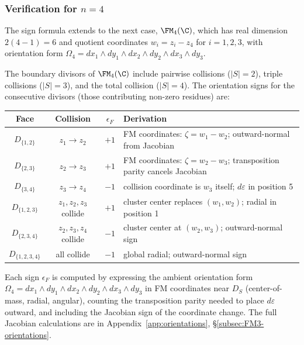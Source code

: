 \subsubsection{\texorpdfstring{Verification for $n=4$}{Verification for n=4}}

The sign formula extends to the next case, $\FM_4(\C)$, which has real dimension $2(4-1) = 6$ and quotient coordinates $w_i = z_i - z_4$ for $i = 1,2,3$, with orientation form $\Omega_4 = dx_1 \wedge dy_1 \wedge dx_2 \wedge dy_2 \wedge dx_3 \wedge dy_3$.

The boundary divisors of $\FM_4(\C)$ include pairwise collisions ($|S| = 2$), triple collisions ($|S| = 3$), and the total collision ($|S| = 4$). The orientation signs for the consecutive divisors (those contributing non-zero residues) are:

\medskip
\begin{center}
\renewcommand{\arraystretch}{1.3}
\begin{tabular}{c|c|c|l}
\textbf{Face} & \textbf{Collision} & $\epsilon_F$ & \textbf{Derivation} \\
\hline
$D_{\{1,2\}}$ & $z_1\to z_2$ & $+1$ & FM coordinates: $\zeta = w_1 - w_2$; outward-normal from Jacobian \\
$D_{\{2,3\}}$ & $z_2\to z_3$ & $+1$ & FM coordinates: $\zeta = w_2 - w_3$; transposition parity cancels Jacobian \\
$D_{\{3,4\}}$ & $z_3\to z_4$ & $-1$ & collision coordinate is $w_3$ itself; $d\varepsilon$ in position 5 \\
$D_{\{1,2,3\}}$ & $z_1,z_2,z_3$ collide & $+1$ & cluster center replaces $(w_1,w_2)$; radial in position 1 \\
$D_{\{2,3,4\}}$ & $z_2,z_3,z_4$ collide & $-1$ & cluster center at $(w_2,w_3)$; outward-normal sign \\
$D_{\{1,2,3,4\}}$ & all collide & $-1$ & global radial; outward-normal sign
\end{tabular}
\end{center}

\medskip\noindent
Each sign $\epsilon_F$ is computed by expressing the ambient orientation form $\Omega_4 = dx_1 \wedge dy_1 \wedge dx_2 \wedge dy_2 \wedge dx_3 \wedge dy_3$ in FM coordinates near $D_S$ (center-of-mass, radial, angular), counting the transposition parity needed to place $d\varepsilon$ outward, and including the Jacobian sign of the coordinate change. The full Jacobian calculations are in Appendix~\ref{app:orientations}, \S\ref{subsec:FM3-orientations}.

